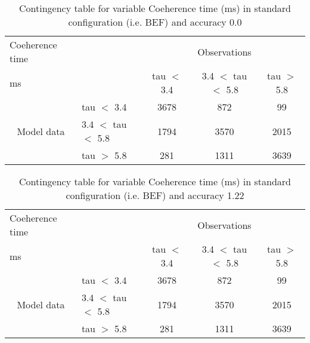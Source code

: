 \documentclass[11pt,english]{article}
\begin{document}
\begin{table}[]
\begin{center}
\begin{tabular}{llccc}
\hline
{Coeherence time}                                       &                                                    & \multicolumn{3}{c}{Observations}                 \\
{ms}                                       &                             & tau $<$ 3.4   & 3.4 $<$ tau $<$ 5.8 & tau $>$ 5.8 \\
\hline
\multicolumn{1}{c}{\multirow{3}{*}{Model data}}  & tau $<$ 3.4             & 3678                & 872                       & 99              \\
                                                 & 3.4  $<$ tau $<$ 5.8 & 1794                & 3570                       & 2015              \\
                                                 & tau $>$ 5.8             & 281                & 1311                       & 3639              \\
\hline
\end{tabular}
\end{center}
\caption{Contingency table for variable Coeherence time (ms) in standard configuration (i.e. BEF) and accuracy 0.0}
\label{tab:contingencytauBEF}
\end{table}
\begin{table}[]
\begin{center}
\begin{tabular}{llccc}
\hline
{Coeherence time}                                       &                                                    & \multicolumn{3}{c}{Observations}                 \\
{ms}                                       &                             & tau $<$ 3.4   & 3.4 $<$ tau $<$ 5.8 & tau $>$ 5.8 \\
\hline
\multicolumn{1}{c}{\multirow{3}{*}{Model data}}  & tau $<$ 3.4             & 3678                & 872                       & 99              \\
                                                 & 3.4  $<$ tau $<$ 5.8 & 1794                & 3570                       & 2015              \\
                                                 & tau $>$ 5.8             & 281                & 1311                       & 3639              \\
\hline
\end{tabular}
\end{center}
\caption{Contingency table for variable Coeherence time (ms) in standard configuration (i.e. BEF) and accuracy 1.22}
\label{tab:contingencytauBEF}
\end{table}
\end{document}
